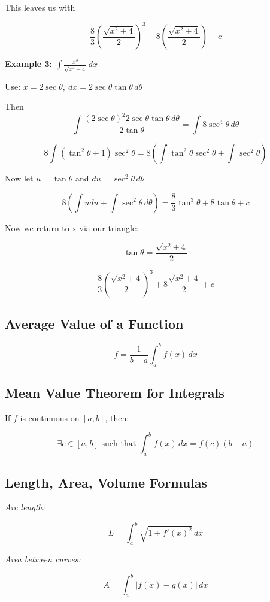 This leaves us with

\[
    \frac{8}{3} {\left(\frac{\sqrt{x^2 + 4}}{2}\right)}^3 - 8 \left( \frac{\sqrt{x^2 + 4}}{2}\right) + c
\]

\textbf{Example 3: \( \int \frac{x^3}{\sqrt{x^4 - 4}} \,dx \)}

Use: \(x = 2\sec \theta, \ dx = 2\sec \theta \tan \theta \,d\theta \)

Then
\[
    \int \frac{{(2\sec\theta)}^2 2\sec\theta \tan\theta \,d\theta}{2\tan\theta} = \int 8\sec^4 \theta\,d\theta
\]

\[
    8\int(\tan^2\theta + 1)\sec^2\theta = 8\left(\int\tan^2\theta\sec^2\theta + \int \sec^2\theta \right)
\]

Now let \(u = \tan\theta\) and \(du = \sec^2\theta \,d\theta\)

\[
    8\left( \int udu  + \int \sec^2\theta\,d\theta\right) = 
    \frac{8}{3}\tan^3\theta + 8\tan\theta + c
\]

Now we return to x via our triangle:

\[
    \tan\theta = \frac{\sqrt{x^2 + 4}}{2}
\]

\[
    \frac{8}{3}{\left(\frac{\sqrt{x^2 + 4}}{2}\right)}^3 + 8 \frac{\sqrt{x^2 + 4}}{2} + c
\]

\subsection{Average Value of a Function}

\[
    \bar{f} = \frac{1}{b - a} \int_a^b f(x)\,dx
\]

\subsection{Mean Value Theorem for Integrals}

If \(f\) is continuous on \([a, b]\), then:

\[
    \exists c \in [a, b] \text{ such that } \int_a^b f(x)\,dx = f(c)(b - a)
\]

\subsection{Length, Area, Volume Formulas}

\emph{Arc length:}

\[
    L = \int_a^b \sqrt{1 + {f'(x)}^2}\,dx
\]

\emph{Area between curves:}

\[
    A = \int_a^b |f(x) - g(x)|\,dx
\]

